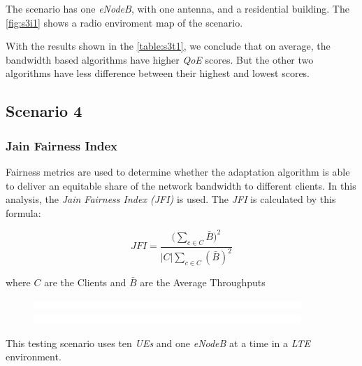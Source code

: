 The scenario has one \textit{eNodeB}, with one antenna, and a residential building. The 
\autoref{fig:s3i1} shows a radio enviroment map of the scenario.



With the results shown in the \autoref{table:s3t1}, we conclude that on average,
the bandwidth based algorithms have higher \textit{QoE} scores. But the other two
algorithms have less difference between their highest and lowest scores.

\clearpage

\subsection{Scenario 4}

\subsubsection{Jain Fairness Index}

Fairness metrics are used to determine whether the adaptation 
algorithm is able to deliver an equitable share of the network bandwidth 
to different clients. In this analysis, the \textit{Jain Fairness Index (JFI)}
\cite{jfi} is used. The \textit{JFI} is calculated by this formula:


\begin{equation}
    JFI=\frac{\bigg(\sum\limits_{c\in C}\bar{B}\bigg)^2}{\left | C \right |\sum\limits_{c\in C}(\bar{B})^2}
\end{equation}

where  $C$ are the Clients and $\bar{B}$ are the Average Throughputs


\begin{figure}[h]
  \centering
  \includegraphics[width=0.9\textwidth]{img/space.png}
  \includegraphics[width=0.9\textwidth]{img/space.png}
\end{figure}

This testing scenario uses ten \textit{UEs} and one \textit{eNodeB} at a time in a \textit{LTE} environment.

